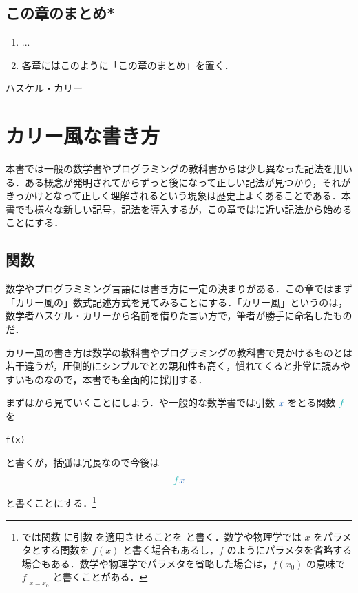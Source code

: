 \documentclass[a5paper,twoside,fleqn,draft]{jsbook}
\begin{document}
\section{この章のまとめ*}

\begin{enumerate}
\item ...  \item 各章にはこのように「この章のまとめ」を置く．
\end{enumerate}

\begin{note}{ハスケル・カリー}
\end{note}

\chapter{カリー風な書き方}
\label{ch:curry}

\begin{leader}
本書では一般の数学書やプログラミングの教科書からは少し異なった記法を用いる．ある概念が発明されてからずっと後になって正しい記法が見つかり，それがきっかけとなって正しく理解されるという現象は歴史上よくあることである．本書でも様々な新しい記号，記法を導入するが，この章では\haskell に近い記法から始めることにする．
\end{leader}

\section{関数}

数学やプログラミミング言語には書き方に一定の決まりがある．この章ではまず「カリー風の」数式記述方式を見てみることにする．「カリー風」というのは，数学者ハスケル・カリーから名前を借りた言い方で，筆者が勝手に命名したものだ．

カリー風の書き方は数学の教科書やプログラミングの教科書で見かけるものとは若干違うが，圧倒的にシンプルで\haskell との親和性も高く，慣れてくると非常に読みやすいものなので，本書でも全面的に採用する．

まずはから見ていくことにしよう．\python や一般的な数学書では引数 $\hVar{x}$ をとる関数 $\hFunc{f}$ を
\begin{pythoncode}
\begin{verbatim}
f(x)
\end{verbatim}
\end{pythoncode}
と書くが，括弧は冗長なので今後は
\begin{equation}
  \hFunc{f}\hVar{x}
\end{equation}
と書くことにする．\footnote{\haskell では関数  に引数 を適用させることを  と書く．数学や物理学では $x$ をパラメタとする関数を $f(x)$ と書く場合もあるし，$f$ のようにパラメタを省略する場合もある．数学や物理学でパラメタを省略した場合は，$f(x_0)$ の意味で $f\vert_{x=x_0}$ と書くことがある．}
\end{document}
